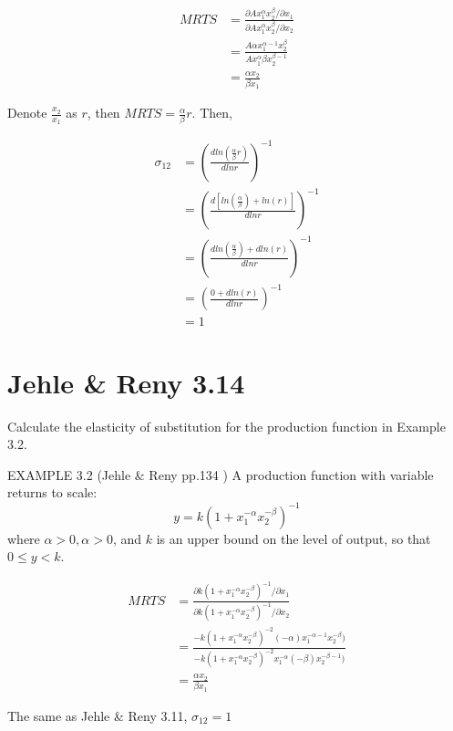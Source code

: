 \documentclass{article}
\begin{document}
\begin{align*}
MRTS &= \frac{\partial  Ax_1^\alpha x_2^\beta / \partial x_1}{\partial  Ax_1^\alpha x_2^\beta / \partial x_2} \\
 &= \frac{A\alpha x_1^{\alpha - 1} x_2^\beta }{Ax_1^\alpha \beta x_2^{\beta -1}} \\
 &= \frac{\alpha x_2}{\beta x_1}
\end{align*}


Denote $\frac{x_2}{ x_1}$ as $r$, then $MRTS =  \frac{\alpha}{\beta} r$. Then,

\begin{align*}
\sigma_{12}&= (\frac{d ln (\frac{\alpha}{\beta} r)}{dln r})^{-1} \\
&= (\frac{d [ln (\frac{\alpha}{\beta}) +ln(r)]}{dln r})^{-1} \\
&= (\frac{d ln (\frac{\alpha}{\beta}) +d ln(r)}{d ln r})^{-1} \\
&= (\frac{0 +d ln(r)}{d ln r})^{-1} \\
& = 1
\end{align*}


\section{Jehle \& Reny 3.14}

Calculate the elasticity of substitution for the production function in Example 3.2.

\begin{mdframed}[backgroundcolor=blue!20,linecolor=white]
EXAMPLE 3.2 (Jehle \& Reny  pp.134 ) A production function with variable returns to scale:
$$y = k(1 + x_1^{-\alpha} x_2^{-\beta} )^{-1}$$
where $\alpha > 0,\alpha > 0$, and $k$ is an upper bound on the level of output, so that $0 \le y < k$.
\end{mdframed}

\begin{align*}
MRTS &= \frac{\partial k(1 + x_1^{-\alpha} x_2^{-\beta} )^{-1} / \partial x_1}{\partial k(1 + x_1^{-\alpha} x_2^{-\beta} )^{-1} / \partial x_2} \\
 &= \frac{-k(1 + x_1^{-\alpha} x_2^{-\beta} )^{-2}(-\alpha) x_1^{-\alpha-1} x_2^{-\beta})}{-k(1 + x_1^{-\alpha} x_2^{-\beta} )^{-2} x_1^{-\alpha} (-\beta)x_2^{-\beta-1})} \\
 &= \frac{\alpha x_2}{\beta x_1}
\end{align*}

The same as Jehle \& Reny 3.11, $\sigma_{12} = 1$
\end{document}
